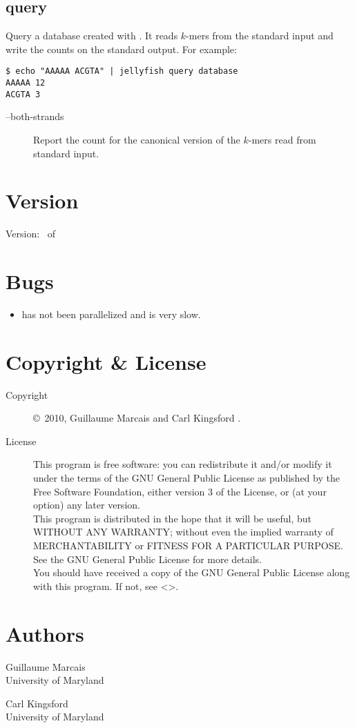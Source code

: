\documentclass[english]{article}
\begin{document}
\subsection{query}

Query a database created with . It reads
$k$-mers from the standard input and write the counts on the standard
output. For example:

\begin{verbatim}
$ echo "AAAAA ACGTA" | jellyfish query database
AAAAA 12
ACGTA 3
\end{verbatim}

\begin{description}
\item[--both-strands] Report the count for the canonical version of
  the $k$-mers read from standard input.
\end{description}

\section{Version}

Version: \Version\ of \Date

\section{Bugs}

\begin{itemize}
\item {} has not been parallelized and is very
  slow.
\end{itemize}

\section{Copyright \& License}
\begin{description}
\item[Copyright] \copyright\ 2010, Guillaume Marcais  and Carl Kingsford .

\item[License] This program is free software: you can redistribute it
  and/or modify it under the terms of the GNU General Public License
  as published by the Free Software Foundation, either version 3 of
  the License, or (at your option) any later version. \\
  This program is distributed in the hope that it will be useful, but
  WITHOUT ANY WARRANTY; without even the implied warranty of
  MERCHANTABILITY or FITNESS FOR A PARTICULAR PURPOSE.  See the GNU
  General Public License for more details. \\
  You should have received a copy of the GNU General Public License
  along with this program.  If not, see
  <>.
\end{description}

\section{Authors}
\noindent
Guillaume Marcais \\
University of Maryland \\

Carl Kingsford \\
University of Maryland \\

\LatexManEnd
\end{document}
